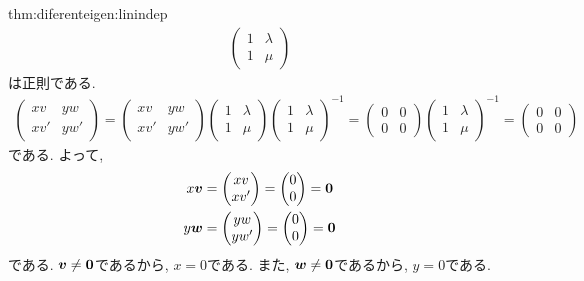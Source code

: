\begin{proofof}{thm:diferenteigen:linindep}
\begin{align*}
\begin{pmatrix}
      1&\lambda\\1&\mu 
    \end{pmatrix}
  \end{align*}
  は正則である.
  \begin{align*}
    \begin{pmatrix}
      xv&yw\\xv'&yw' 
    \end{pmatrix}=
    \begin{pmatrix}
      xv&yw\\xv'&yw' 
    \end{pmatrix}
    \begin{pmatrix}
      1&\lambda\\1&\mu 
    \end{pmatrix}
    \begin{pmatrix}
      1&\lambda\\1&\mu 
    \end{pmatrix}^{-1}
    =
    \begin{pmatrix}
      0&0\\0&0
    \end{pmatrix}
    \begin{pmatrix}
      1&\lambda\\1&\mu 
    \end{pmatrix}^{-1}
    =
    \begin{pmatrix}
      0&0\\0&0
    \end{pmatrix}
  \end{align*}
  である.
  よって,
  \begin{align*}
    x\boldsymbol{v}&=
    \begin{pmatrix}
      xv\\xv' 
    \end{pmatrix}=
    \begin{pmatrix}
      0\\0
    \end{pmatrix}
    =\boldsymbol{0}\\
    y\boldsymbol{w}&=
    \begin{pmatrix}
      yw\\yw' 
    \end{pmatrix}=
    \begin{pmatrix}
      0\\0
    \end{pmatrix}
    =\boldsymbol{0}
  \end{align*}
  である. $\boldsymbol{v}\neq\boldsymbol{0}$であるから, $x=0$である.
  また, $\boldsymbol{w}\neq\boldsymbol{0}$であるから, $y=0$である.
\end{proofof}

